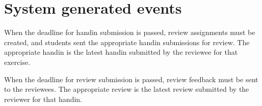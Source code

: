 \documentclass[Main]{subfiles}
\begin{document}
\section{System generated events}\label{sec:SysGenEvents}

\begin{EventTable}
\Record
{When the deadline for handin submission is passed, review assignments must be created, and students sent the appropriate handin submissions for review. 
The appropriate handin is the latest handin submitted by the reviewee for that exercise.}{}{}

\Record
{When the deadline for review submission is passed, review feedback must be sent to the reviewees. The appropriate review is the latest review submitted by the reviewer for that handin.}{}{}

\end{EventTable}
\end{document}
